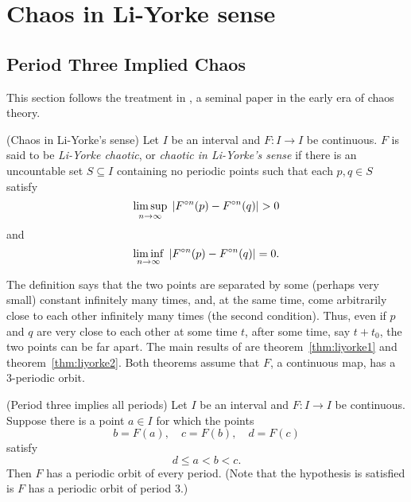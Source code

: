\documentclass[12pt,draft,twoside]{book}
\begin{document}
\chapter{Chaos in Li-Yorke sense}

\section{Period Three Implied Chaos}
This section follows the treatment in \citet{li-yorke}, a seminal paper in the early era of chaos theory.

\begin{definition}
  (Chaos in Li-Yorke's sense)
  Let $I$ be an interval and $F: I\to I$ be continuous. $F$ is said to be \textit{Li-Yorke chaotic}, or 
  \textit{chaotic in Li-Yorke's sense} if there is an uncountable set $S \subseteq I$ containing no
  periodic points such that each $p,q \in S$ satisfy
  \begin{equation*}
    \limsup\limits_{n \to \infty}\; \left | F^{\circ n}(p) - F^{\circ n}(q) \right | > 0
  \end{equation*}
  and
  \begin{equation*}
    \liminf\limits_{n \to \infty}\; \left | F^{\circ n}(p) - F^{\circ n}(q) \right | = 0.
  \end{equation*}
\end{definition}

The definition says that the two points are separated by some (perhaps very small) constant infinitely many times, and, at the same time, come arbitrarily close to each other infinitely many times (the second condition). 
Thus, even if $p$ and $q$ are very close to each other at some time $t$, after some time, say $t + t_0$, the two points can be far apart.
The main results of \citet{li-yorke} are theorem~\ref{thm:liyorke1} and theorem~\ref{thm:liyorke2}.
Both theorems assume that $F$, a continuous map, has a 3-periodic orbit.

\begin{theorem}
  (Period three implies all periods)
  Let $I$ be an interval and $F: I\to I$ be continuous. Suppose there is a point $a \in I$ for which
  the points
  \begin{equation*}
  b = F(a), \quad c = F(b), \quad d = F(c)
  \end{equation*}
  satisfy
  \begin{equation*}
    d \leq a < b < c.
  \end{equation*}
  Then $F$ has a periodic orbit of every period.
  (Note that the hypothesis is satisfied is $F$ has a periodic orbit of period 3.)
  \label{thm:liyorke1}
\end{theorem}
\end{document}
